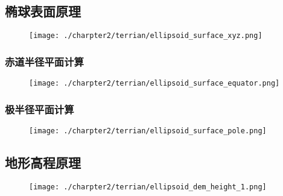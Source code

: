 \subsection{椭球表面原理}
\label{sec:ellipsoid-surface}

\begin{figure}[!htb]
	\centering
	\texttt{[image: ./charpter2/terrian/ellipsoid\_surface\_xyz.png]}
\end{figure}

\subsubsection{赤道半径平面计算}
\begin{figure}[!htb]
	\centering
	\texttt{[image: ./charpter2/terrian/ellipsoid\_surface\_equator.png]}
\end{figure}
\subsubsection{极半径平面计算}
\begin{figure}[!htb]
	\centering
	\texttt{[image: ./charpter2/terrian/ellipsoid\_surface\_pole.png]}
\end{figure}

\subsection{地形高程原理}
\label{sec:ellipsoid-dem-height}
\begin{figure}[!htb]
	\centering
	\texttt{[image: ./charpter2/terrian/ellipsoid\_dem\_height\_1.png]}
\end{figure}

